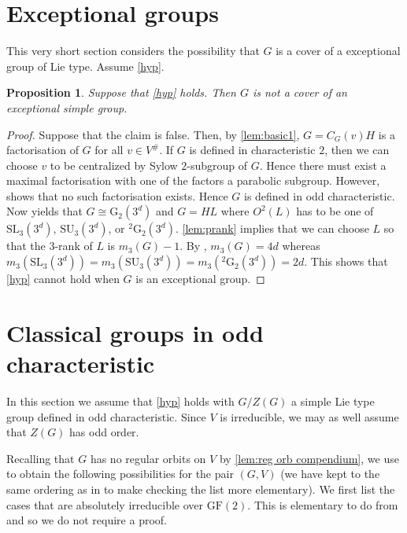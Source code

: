 \documentclass[12pt]{amsart}
\newtheorem{proposition}[theorem]{Proposition}
\theoremstyle{remark}
\theoremstyle{notation}
\theoremstyle{definition}
\newcommand{\SU}{\mathrm{SU}}
\newcommand{\G}{\mathrm{G}}
\newcommand{\GF}{\mathrm{GF}}
\newcommand{\SL}{\mathrm{SL}}
\newcommand{\0}{\emptyset}
\begin{document}
\section{Exceptional groups}\label{sec:exceptional}


This very short section considers the possibility that $ G $ is a cover of a  exceptional group of Lie type. Assume \cref{hyp}.

\begin{proposition}\label{thm: Exceps} Suppose that  \cref{hyp} holds. Then $ G $   is not a cover of an exceptional simple group.
\end{proposition}

\begin{proof} Suppose that the claim is false. Then, by \cref{lem:basic1},  $G= C_G(v)H$ is a factorisation of $G$ for all $v \in V^\#$. If $G$ is defined in characteristic $2$, then we can choose $v$ to be centralized by Sylow $2$-subgroup of $G$.  Hence there must exist a maximal factorisation with one of the factors a parabolic subgroup. However,  \cite[Theorem B, Table 5]{LiebeckPraegerSaxl} shows that no such factorisation exists. Hence $G$ is defined in odd characteristic. Now \cite[Theorem B, Table 5]{LiebeckPraegerSaxl}
 yields that $ G  \cong \G_2(3^d)$ and $G= HL$ where $O^2(L) $ has to be one of $ \SL_3(3^d)$, $\SU_3(3^d)$, or ${}^2\G_2(3^d)$. \cref{lem:prank} implies that we can choose $L$ so that the $3$-rank of $L$ is $m_3( G )-1$.  By \cite[Theorem 3.3.3]{GLS3}, $m_3(G)=4d$ whereas $m_3(\SL_3(3^d))= m_3(\SU_3(3^d))= m_3({}^2\G_2(3^d))=2d$. This shows that \cref{hyp} cannot hold when $G$ is an exceptional group.
\end{proof}


\section{Classical groups in odd characteristic}\label{sec:odd}



In this section we   assume that \cref{hyp} holds with $ G /Z(G)$   a  simple Lie type group defined in odd characteristic. Since $V$ is irreducible, we may as well assume that $Z(G)$ has odd order.

Recalling that $G$ has no regular orbits on $V$ by \cref{lem:reg orb compendium}, we use \cite[Corollary 1.2]{Lee1} to obtain the following  possibilities for the pair $(G,V)$ (we have kept to the same ordering as in \cite{Lee1} to make checking the list more elementary). We first list the cases that are absolutely irreducible over $\GF(2)$. This is elementary to do from  \cite[Table 1.2]{Lee1} and so we do not require a proof.
\end{document}
